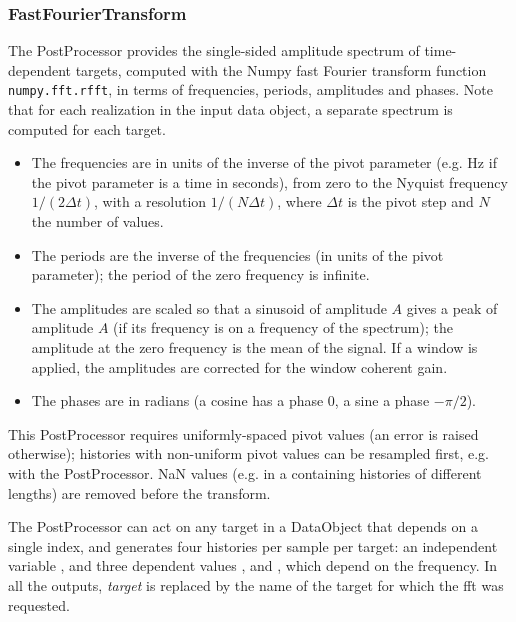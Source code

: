 \subsubsection{FastFourierTransform}
\label{FastFourierTransformPP}
The  PostProcessor provides the single-sided amplitude spectrum of time-dependent
targets, computed with the Numpy fast Fourier transform function \texttt{numpy.fft.rfft}, in terms of
frequencies, periods, amplitudes and phases. Note that for each realization in the input data object, a separate
spectrum is computed for each target.
\begin{itemize}
  \item The frequencies are in units of the inverse of the pivot parameter (e.g. Hz if the pivot parameter is a time
    in seconds), from zero to the Nyquist frequency $1/(2 \Delta t)$, with a resolution $1/(N \Delta t)$, where
    $\Delta t$ is the pivot step and $N$ the number of values.
  \item The periods are the inverse of the frequencies (in units of the pivot parameter); the period of the zero
    frequency is infinite.
  \item The amplitudes are scaled so that a sinusoid of amplitude $A$ gives a peak of amplitude $A$ (if its
    frequency is on a frequency of the spectrum); the amplitude at the zero frequency is the mean of the signal.
    If a window is applied, the amplitudes are corrected for the window coherent gain.
  \item The phases are in radians (a cosine has a phase 0, a sine a phase $-\pi/2$).
\end{itemize}
This PostProcessor requires uniformly-spaced pivot values (an error is raised otherwise); histories with
non-uniform pivot values can be resampled first, e.g. with the  PostProcessor.
NaN values (e.g. in a  containing histories of different lengths) are removed before the transform.

The  PostProcessor can act on any target in a DataObject that depends on a
single index, and generates four histories per sample per target: an independent variable
, and three dependent values ,
 and , which depend on the frequency. In all the
outputs, \emph{target} is replaced by the name of the target for which the fft was requested.

